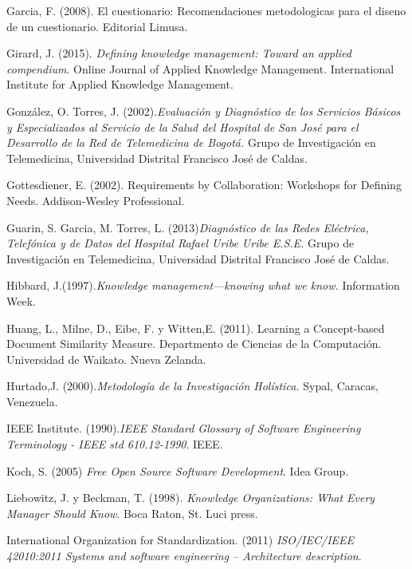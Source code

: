 \begin{thebibliography}{}
 Garcia, F. (2008). El cuestionario: Recomendaciones metodologicas para el diseno de un cuestionario. Editorial Limusa.

 Girard, J. (2015). \textit{Defining knowledge management: Toward an applied compendium}. Online Journal of Applied Knowledge Management. International Institute for Applied Knowledge Management.

 González, O. Torres, J. (2002).\textit{Evaluación y Diagnóstico de los Servicios Básicos y Especializados al Servicio de la Salud del Hospital de San José para el Desarrollo de la Red de Telemedicina de Bogotá.} Grupo de Investigación en Telemedicina, Universidad Distrital Francisco José de Caldas.

 Gottesdiener, E. (2002). Requirements by Collaboration: Workshops for Defining Needs. Addison-Wesley Professional.

 Guarin, S. Garcia, M. Torres, L. (2013)\textit{Diagnóstico de las Redes Eléctrica, Telefónica y de Datos del Hospital Rafael Uribe Uribe E.S.E.} Grupo de Investigación en Telemedicina,  Universidad Distrital Francisco José de Caldas.

 Hibbard, J.(1997).\textit{Knowledge management—knowing what we know.} Information Week.

 Huang, L., Milne, D., Eibe, F. y Witten,E. (2011). Learning a Concept-based Document Similarity Measure. Departmento de Ciencias de la Computación. Universidad de Waikato. Nueva Zelanda.

 Hurtado,J. (2000).\textit{Metodología de la Investigación Holística.} Sypal, Caracas, Venezuela.


 IEEE Institute. (1990).\textit{IEEE Standard Glossary of Software Engineering Terminology - IEEE std 610.12-1990}. IEEE.

 Koch, S. (2005) \textit{Free Open Source Software Development}. Idea Group.

 Liebowitz, J. y Beckman, T. (1998). \textit{Knowledge Organizations: What Every Manager Should Know}. Boca Raton, St. Luci press.

 International Organization for Standardization. (2011) \textit{ISO/IEC/IEEE 42010:2011 Systems and software engineering -- Architecture description}. 


\end{thebibliography}
